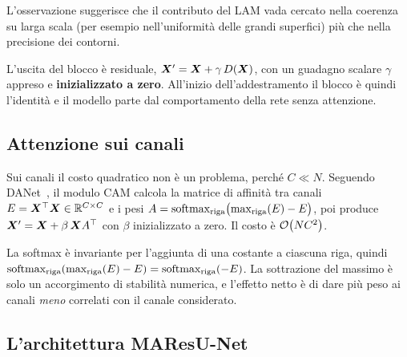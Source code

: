 L'osservazione suggerisce che il contributo del LAM vada cercato nella coerenza su larga scala
(per esempio nell'uniformità delle grandi superfici) più che nella precisione dei contorni.

L'uscita del blocco è residuale, $\bm{X}'=\bm{X}+\gamma\,D(\bm{X})$, con un guadagno
scalare $\gamma$ appreso e \textbf{inizializzato a zero}. All'inizio dell'addestramento il
blocco è quindi l'identità e il modello parte dal comportamento della rete senza attenzione.

\subsection{Attenzione sui canali}
\label{sec:cam}

Sui canali il costo quadratico non è un problema, perché $C\ll N$. Seguendo
DANet~\cite{fu2019danet}, il modulo CAM calcola la matrice di affinità tra canali
$E=\bm{X}^{\top}\bm{X}\in\mathbb{R}^{C\times C}$ e i pesi
$A=\operatorname{softmax}_{\mathrm{riga}}\bigl(\max_{\mathrm{riga}}(E)-E\bigr)$, poi produce
$\bm{X}'=\bm{X}+\beta\,\bm{X}A^{\top}$ con $\beta$ inizializzato a zero. Il costo è
$\mathcal{O}\!\left(NC^2\right)$.

\begin{osservazione}
La softmax è invariante per l'aggiunta di una costante a ciascuna riga, quindi
$\operatorname{softmax}_{\mathrm{riga}}(\max_{\mathrm{riga}}(E)-E)=\operatorname{softmax}_{\mathrm{riga}}(-E)$. La
sottrazione del massimo è solo un accorgimento di stabilità numerica, e l'effetto netto è di
dare più peso ai canali \emph{meno} correlati con il canale considerato.
\end{osservazione}

\subsection{L'architettura MAResU-Net}
\label{sec:maresunet}

